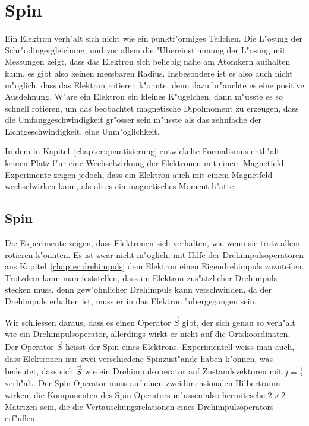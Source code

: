 \chapter{Spin\label{chapter:spin}}
\rhead{}
Ein Elektron verh"alt sich nicht wie ein punktf"ormiges Teilchen.
Die L"osung der Schr"odingergleichung, und vor allem die "Ubereinstimmung
der L"osung mit Messungen zeigt, dass das Elektron sich beliebig nahe 
am Atomkern aufhalten kann, es gibt also keinen messbaren Radius.
Insbesondere ist es also auch nicht m"oglich, dass das Elektron
rotieren k"onnte, denn dazu br"auchte es eine positive Ausdehnung.
W"are ein Elektron ein kleines K"ugelchen, dann m"usste es so schnell
rotieren, um das beobachtet magnetische Dipolmoment zu erzeugen, dass
die Umfanggeschwindigkeit gr"osser sein m"usste als das zehnfache
der Lichtgeschwindigkeit, eine Unm"oglichkeit.

In dem in Kapitel~\ref{chapter:quantisierung} entwickelte Formalismus
enth"alt keinen Platz f"ur eine Wechselwirkung der Elektronen
mit einem Magnetfeld.
Experimente zeigen jedoch, dass ein Elektron auch mit einem Magnetfeld
wechselwirken kann, als ob es ein magnetisches Moment h"atte. 

%
%
\section{Spin}
Die Experimente zeigen, dass Elektronen sich verhalten, wie wenn sie
trotz allem rotieren k"onnten.
Es ist zwar nicht m"oglich, mit Hilfe der Drehimpulsoperatoren
aus Kapitel~\ref{chapter:drehimpuls}
dem Elektron einen Eigendrehimpuls zuzuteilen.
Trotzdem kann man feststellen, dass im Elektron zus"atzlicher
Drehimpuls stecken muss, denn gew"ohnlicher Drehimpuls kann verschwinden,
da der Drehimpuls erhalten ist, muss er in das Elektron "ubergegangen
sein.

Wir schliessen daraus, dass es einen Operator $\vec S$ gibt, der sich
genau so verh"alt wie ein Drehimpulsoperator, allerdings wirkt er nicht
auf die Ortskoordinaten.
Der Operator $\vec S$ heisst der Spin eines Elektrons.
Experimentell weiss man auch, dass Elektronen nur zwei verschiedene
Spinzust"ande haben k"onnen, was bedeutet, dass sich $\vec S$ wie ein
Drehimpulsoperator auf Zustandsvektoren mit $j=\frac12$ verh"alt.
Der Spin-Operator muss auf einen zweidimensionalen Hilbertraum
wirken, die Komponenten des Spin-Operators m"ussen also hermitesche
$2\times 2$-Matrizen sein, die die Vertauschungsrelationen eines
Drehimpulsoperators erf"ullen.

